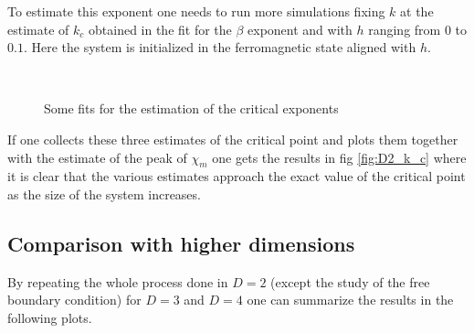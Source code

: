 \documentclass[a4paper, 11pt]{article}
\begin{document}
    To estimate this exponent one needs to run more simulations fixing $k$ at the estimate of $k_c$ obtained in the fit for the $\beta$ exponent and with $h$ ranging from $0$ to $0.1$. Here the system is initialized in the ferromagnetic state aligned with $h$.

    \begin{figure}[H]
      \centering
      \begin{subfigure}[Fit of the specific heat: estimation of $\alpha_1$, $\alpha_2$.]{
        \label{fig:D2_alpha}}
      \end{subfigure}
      \begin{subfigure}[Fit of the magnetization with respect to $k$ at $h = 0$: estimation of $\beta$.]{
        \label{fig:D2_beta}}
      \end{subfigure}\\
      \begin{subfigure}[Fit of the magnetic susceptibility: estimation of $\gamma_1$, $\gamma_2$.]{
        \label{fig:D2_gamma}}
      \end{subfigure}
      \begin{subfigure}[Fit of the magnetization with respect to $h$ at $k = k_c$: estimation of $\delta$.]{
        \label{fig:D2_delta}}
      \end{subfigure}
      \caption{Some fits for the estimation of the critical exponents}
    \end{figure}

    If one collects these three estimates of the critical point and plots them together with the estimate of the peak of $\chi_m$ one gets the results in fig \ref{fig:D2_k_c} where it is clear that the various estimates approach the exact value of the critical point as the size of the system increases.


  \subsection{Comparison with higher dimensions}
    By repeating the whole process done in $D=2$ (except the study of the free boundary condition) for $D = 3$ and $D = 4$ one can summarize the results in the following plots.
\end{document}
